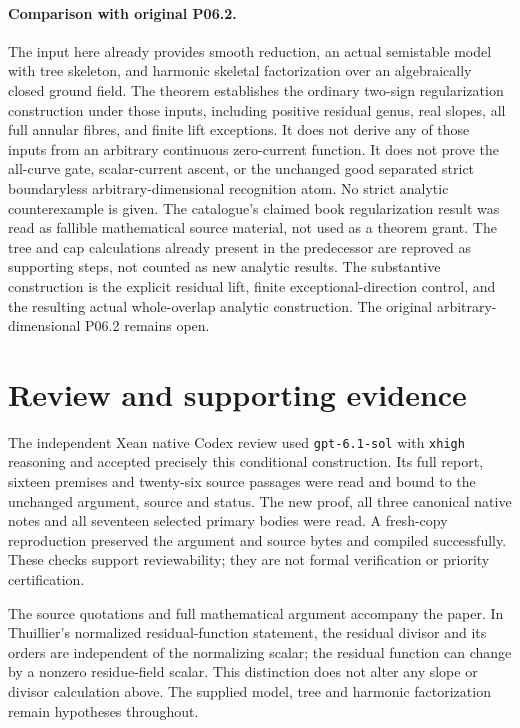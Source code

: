 \documentclass[11pt]{article}
\begin{document}
\paragraph{Comparison with original P06.2.}
The input here already provides smooth reduction, an actual
semistable model with tree skeleton, and harmonic skeletal
factorization over an algebraically closed ground field.
The theorem establishes the ordinary two-sign regularization
construction under those inputs, including positive residual
genus, real slopes, all full annular fibres, and finite lift
exceptions. It does not derive any of those inputs from an
arbitrary continuous zero-current function. It does not prove
the all-curve gate, scalar-current ascent, or the unchanged
good separated strict boundaryless arbitrary-dimensional
recognition atom. No strict analytic counterexample is given.
The catalogue's claimed book regularization result was read
as fallible mathematical source material, not used as a theorem
grant. The tree and cap calculations already present in the
predecessor are reproved as supporting steps, not counted as
new analytic results. The substantive construction is
the explicit residual lift, finite exceptional-direction
control, and the resulting actual whole-overlap analytic
construction. The original arbitrary-dimensional P06.2 remains open.

\section*{Review and supporting evidence}
The independent Xean native Codex review used \texttt{gpt-6.1-sol}
with \texttt{xhigh} reasoning and accepted precisely this conditional
construction. Its full report, sixteen premises and twenty-six source
passages were read and bound to the unchanged argument, source and status.
The new proof, all three canonical native notes and all seventeen selected
primary bodies were read. A fresh-copy reproduction preserved the argument
and source bytes and compiled successfully. These checks support reviewability;
they are not formal verification or priority certification.

The source quotations and full mathematical argument accompany the paper.
In Thuillier's normalized residual-function statement, the residual divisor
and its orders are independent of the normalizing scalar; the residual
function can change by a nonzero residue-field scalar. This distinction
does not alter any slope or divisor calculation above. The supplied model,
tree and harmonic factorization remain hypotheses throughout.
\end{document}
